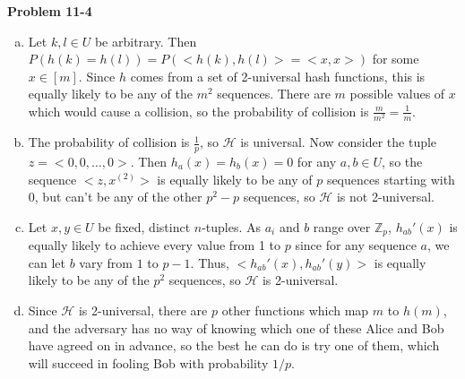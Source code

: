\documentclass{article}
\begin{document}
\noindent\textbf{Problem 11-4}\\
\begin{enumerate}[a.]
\item Let $k, l \in U$ be arbitrary.  Then $P(h(k) = h(l)) = P(<h(k),h(l)> = <x,x>)$ for some $x \in [m]$.  Since $h$ comes from a set of 2-universal hash functions, this is equally likely to be any of the $m^2$ sequences.  There are $m$ possible values of $x$ which would cause a collision, so the probability of collision is $\frac{m}{m^2} = \frac{1}{m}$. 

\item The probability of collision is $\frac{1}{p}$, so $\mathcal{H}$ is universal.  Now consider the tuple $z = <0,0,\ldots, 0>$.  Then $h_a(x) = h_b(x) = 0$ for any $a, b \in U$, so the sequence $<z, x^{(2)}>$ is equally likely to be any of $p$ sequences starting with $0$, but can't be any of the other $p^{2} - p$ sequences, so $\mathcal{H}$ is not 2-universal. 

\item Let $x, y \in U$ be fixed, distinct $n$-tuples.  As $a_i$ and $b$ range over $\mathbb{Z}_p$, $h_{ab}'(x)$ is equally likely to achieve every value from 1 to $p$ since for any sequence $a$, we can let $b$ vary from $1$ to $p-1$. Thus, $<h_{ab}'(x), h_{ab}'(y)>$ is equally likely to be any of the $p^2$ sequences, so $\mathcal{H}$ is 2-universal. 

\item Since $\mathcal{H}$ is 2-universal, there are $p$ other functions which map $m$ to $h(m)$, and the adversary has no way of knowing which one of these Alice and Bob have agreed on in advance, so the best he can do is try one of them, which will succeed in fooling Bob with probability $1/p$. 
\end{enumerate}
\end{document}
